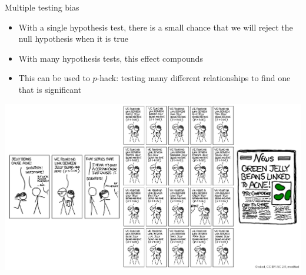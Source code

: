 \begin{frame}{Multiple testing bias}
    \begin{itemize}
      \item With a single hypothesis test, there is a small chance that we will reject the null hypothesis when it is true
      \item With many hypothesis tests, this effect compounds
      \item This can be used to $p$-hack: testing many different relationships to find one that is significant
    \end{itemize}
\end{frame}

\begin{frame}[plain]
  \includegraphics[width=\textwidth]{xkcd_significant.png}
\end{frame}

